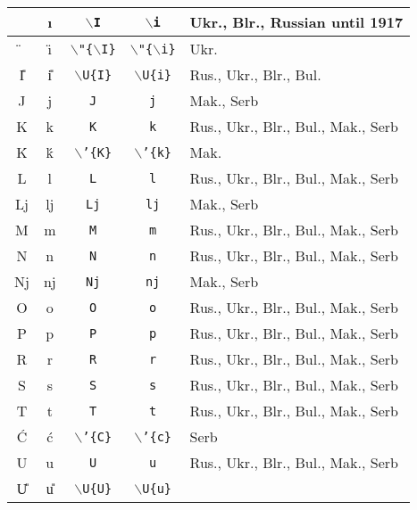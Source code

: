 \documentclass[a4paper]{article}
\def\cyr{\fontencoding{OT2}\fontfamily{wncyr}\selectfont}
\begin{document}
\begin{tabular}{|cc|cc|l|}
	\hline
	{\cyr \I} & {\cyr \i} & \texttt{$\backslash$I} &
		\texttt{$\backslash$i} &
		Ukr., Blr., Russian until 1917 \\
	\hline
	{\cyr \"{\I}} & {\cyr \"{\i}} &
		\texttt{$\backslash$"\{$\backslash$I\}} &
		\texttt{$\backslash$"\{$\backslash$i\}} &
		Ukr. \\
	\hline
	{\cyr \U{I}} & {\cyr \U{i}} & \texttt{$\backslash$U\{I\}} &
		\texttt{$\backslash$U\{i\}} &
		Rus., Ukr., Blr., Bul. \\
	\hline
	{\cyr J} & {\cyr j} & \texttt{J} & \texttt{j} &
		Mak., Serb \\
	\hline
	{\cyr K} & {\cyr k} & \texttt{K} & \texttt{k} &
		Rus., Ukr., Blr., Bul., Mak., Serb \\
	\hline
	{\cyr \'{K}} & {\cyr \'{k}} & \texttt{$\backslash$'\{K\}} &
		\texttt{$\backslash$'\{k\}} &
		Mak. \\
	\hline
	{\cyr L} & {\cyr l} & \texttt{L} & \texttt{l} &
		Rus., Ukr., Blr., Bul., Mak., Serb \\
	\hline
	{\cyr Lj} & {\cyr lj} & \texttt{Lj} & \texttt{lj} &
		Mak., Serb \\
	\hline
	{\cyr M} & {\cyr m} & \texttt{M} & \texttt{m} &
		Rus., Ukr., Blr., Bul., Mak., Serb \\
	\hline
	{\cyr N} & {\cyr n} & \texttt{N} & \texttt{n} &
		Rus., Ukr., Blr., Bul., Mak., Serb \\
	\hline
	{\cyr Nj} & {\cyr nj} & \texttt{Nj} & \texttt{nj} &
		Mak., Serb \\
	\hline
	{\cyr O} & {\cyr o} & \texttt{O} & \texttt{o} &
		Rus., Ukr., Blr., Bul., Mak., Serb \\
	\hline
	{\cyr P} & {\cyr p} & \texttt{P} & \texttt{p} &
		Rus., Ukr., Blr., Bul., Mak., Serb \\
	\hline
	{\cyr R} & {\cyr r} & \texttt{R} & \texttt{r} &
		Rus., Ukr., Blr., Bul., Mak., Serb \\
	\hline
	{\cyr S} & {\cyr s} & \texttt{S} & \texttt{s} &
		Rus., Ukr., Blr., Bul., Mak., Serb \\
	\hline
	{\cyr T} & {\cyr t} & \texttt{T} & \texttt{t} &
		Rus., Ukr., Blr., Bul., Mak., Serb \\
	\hline
	{\cyr \'{C}} & {\cyr \'{c}} & \texttt{$\backslash$'\{C\}} &
		\texttt{$\backslash$'\{c\}} &
		Serb \\
	\hline
	{\cyr U} & {\cyr u} & \texttt{U} & \texttt{u} &
		Rus., Ukr., Blr., Bul., Mak., Serb \\
	\hline
	{\cyr \U{U}} & {\cyr \U{u}} & \texttt{$\backslash$U\{U\}} &
		\texttt{$\backslash$U\{u\}} &

\end{tabular}
\end{document}
